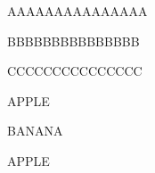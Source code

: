 \documentclass[12pt]{article}
\begin{document}




\begin{center}
    AAAAAAAAAAAAAAA
\end{center}


BBBBBBBBBBBBBBB


\begin{Large}
    CCCCCCCCCCCCCCC
\end{Large}


\begin{center}
    APPLE

    \begin{Large}
        BANANA
    \end{Large}

    APPLE
\end{center}
\end{document}
